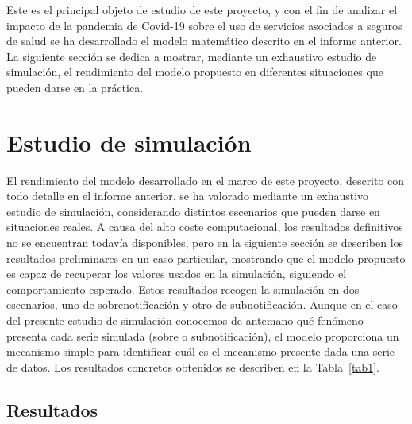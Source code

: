 \documentclass[12pt,twoside]{article} %
\begin{document}
Este es el principal objeto de estudio de este proyecto, y con el fin de analizar el impacto de la pandemia de Covid-19 sobre el uso de servicios asociados a seguros de salud se ha desarrollado el modelo matemático descrito en el informe anterior. La siguiente sección se dedica a mostrar, mediante un exhaustivo estudio de simulación, el rendimiento del modelo propuesto en diferentes situaciones que pueden darse en la práctica.

\section{Estudio de simulación}
El rendimiento del modelo desarrollado en el marco de este proyecto, descrito con todo detalle en el informe anterior, se ha valorado mediante un exhaustivo estudio de simulación, considerando distintos escenarios que pueden darse en situaciones reales. A causa del alto coste computacional, los resultados definitivos no se encuentran todavía disponibles, pero en la siguiente sección se describen los resultados preliminares en un caso particular, mostrando que el modelo propuesto es capaz de recuperar los valores usados en la simulación, siguiendo el comportamiento esperado. Estos resultados recogen la simulación en dos escenarios, uno de sobrenotificación y otro de subnotificación. Aunque en el caso del presente estudio de simulación conocemos de antemano qué fenómeno presenta cada serie simulada (sobre o subnotificación), el modelo proporciona un mecanismo simple para identificar cuál es el mecanismo presente dada una serie de datos. Los resultados concretos obtenidos se describen en la Tabla~\ref{tab1}.

\subsection{Resultados}
\end{document}
